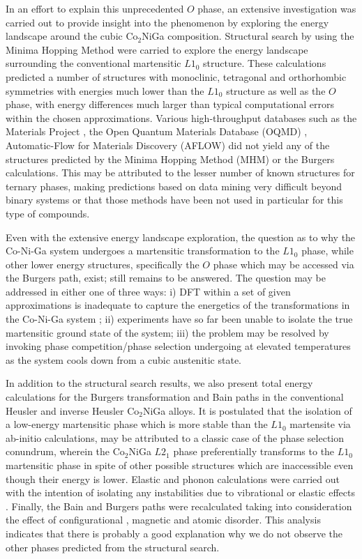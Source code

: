 \documentclass[%
preprint,
 amsmath,amssymb,
 aps,
prb,
showkeys,
]{revtex4-1}
\begin{document}
In an effort to explain this unprecedented $O$ phase, an extensive investigation was carried out to provide insight into the phenomenon by exploring the energy landscape around the cubic Co$_2$NiGa composition. Structural search by using the Minima Hopping Method\cite{Goedecker2004} were carried to explore the energy landscape surrounding the conventional martensitic $L1_0$ structure.  These calculations predicted a number of structures with monoclinic, tetragonal and orthorhombic symmetries with energies much lower than the $L1_0$ structure as well as the $O$ phase, with energy differences much larger than typical computational errors within the chosen approximations. Various high-throughput databases such as the Materials Project \cite{Materialsproject}, the Open Quantum Materials Database (OQMD) \cite{OQMD},  Automatic-Flow for Materials Discovery (AFLOW) \cite{curtarolo2009aflow} did not yield any of the structures predicted by the Minima Hopping Method (MHM) or the Burgers calculations. This may be attributed to the lesser number of known structures for ternary phases, making predictions based on data mining very difficult beyond binary systems or that those methods have been not used in particular for this type of compounds.

Even with the extensive energy landscape exploration, the question as to why the Co-Ni-Ga system undergoes a martensitic transformation to the $L1_0$  phase, while other lower energy structures, specifically the $O$ phase which may be accessed via the Burgers path, exist; still remains to be answered. The question may be addressed in either one of three ways: i) DFT  within a set of given approximations is inadequate to capture the energetics of the transformations in the  Co-Ni-Ga system ; ii) experiments  have so far been unable to isolate the true  martensitic ground state of the system; iii) the problem may be resolved by invoking phase competition/phase selection undergoing at elevated temperatures as the system cools down from a cubic austenitic state.

In addition to the structural search results, we also present total energy calculations for the Burgers transformation and Bain paths in the conventional Heusler and inverse Heusler Co$_2$NiGa  alloys. It is postulated that the isolation of a low-energy martensitic phase which is more stable than the $L1_0$ martensite via ab-initio calculations, may be attributed to a classic case of the phase selection conundrum, wherein the Co$_2$NiGa $L2_1$ phase preferentially transforms to the $L1_0$ martensitic phase in spite of other possible structures  which are inaccessible even though their energy is lower. Elastic and phonon calculations  were carried out with the intention of isolating any instabilities due to vibrational or elastic effects .  Finally, the Bain and Burgers paths were recalculated taking into consideration the effect of configurational , magnetic and atomic disorder. This analysis indicates that there is probably a good explanation  why we do not  observe the other phases  predicted from the structural 
search.
\end{document}
